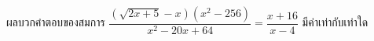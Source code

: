 ﻿%
\question ผลบวกคำตอบของสมการ $ \dfrac{(\sqrt{2x+5}-x)(x^2-256) }{x^2-20x+64} = \dfrac{x+16}{x-4} $ มีค่าเท่ากับเท่าใด
\newline
{}
